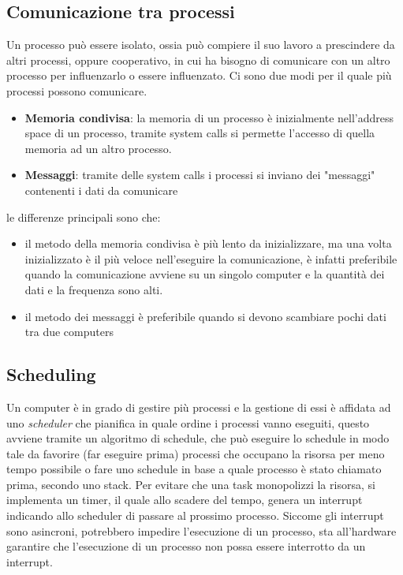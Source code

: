 \documentclass{article}
\begin{document}
    \subsection{Comunicazione tra processi}
            Un processo può essere isolato, ossia può compiere il suo lavoro a prescindere da altri processi, oppure cooperativo, in cui ha bisogno di comunicare con un altro processo per influenzarlo o essere influenzato.
            Ci sono due modi per il quale più processi possono comunicare.
            \begin{itemize}
                \item \textbf{Memoria condivisa}:
                    la memoria di un processo è inizialmente nell'address space di un processo, tramite system calls si permette l'accesso di quella memoria ad un altro processo.
                    
                \item \textbf{Messaggi}:
                    tramite delle system calls i processi si inviano dei "messaggi" contenenti i dati da comunicare
            \end{itemize}

            le differenze principali sono che:
            \begin{itemize}
                \item il metodo della memoria condivisa è più lento da inizializzare, ma una volta inizializzato è il più veloce nell'eseguire la comunicazione, è infatti preferibile quando la comunicazione avviene su un singolo computer e la quantità dei dati e la frequenza sono alti.
                \item il metodo dei messaggi è preferibile quando si devono scambiare pochi dati tra due computers
            \end{itemize}
    \subsection{Scheduling}

        Un computer è in grado di gestire più processi e la gestione di essi è affidata ad uno \textit{scheduler} che pianifica in quale ordine i processi vanno eseguiti, questo avviene tramite un algoritmo di schedule, che può eseguire lo schedule in modo tale da favorire (far eseguire prima) processi che occupano la risorsa per meno tempo possibile o fare uno schedule in base a quale processo è stato chiamato prima, secondo uno stack.
        Per evitare che una task monopolizzi la risorsa, si implementa un timer, il quale allo scadere del tempo, genera un interrupt indicando allo scheduler di passare al prossimo processo.
        Siccome gli interrupt sono asincroni, potrebbero impedire l'esecuzione di un processo, sta all'hardware garantire che l'esecuzione di un processo non possa essere interrotto da un interrupt.
\end{document}
